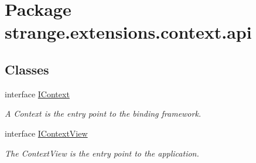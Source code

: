 \hypertarget{namespacestrange_1_1extensions_1_1context_1_1api}{\section{Package strange.\-extensions.\-context.\-api}
\label{namespacestrange_1_1extensions_1_1context_1_1api}
}
\subsection*{Classes}
\begin{DoxyCompactItemize}
\item 
interface \hyperlink{interfacestrange_1_1extensions_1_1context_1_1api_1_1_i_context}{I\-Context}
\begin{DoxyCompactList}\small\item\em A Context is the entry point to the binding framework. \end{DoxyCompactList}\item 
interface \hyperlink{interfacestrange_1_1extensions_1_1context_1_1api_1_1_i_context_view}{I\-Context\-View}
\begin{DoxyCompactList}\small\item\em The Context\-View is the entry point to the application. \end{DoxyCompactList}\end{DoxyCompactItemize}
